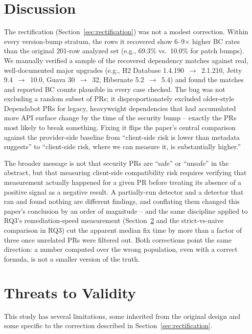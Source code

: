 \documentclass[10pt,journal]{IEEEtran}
\begin{document}
\section{Discussion}
The rectification (Section~\ref{sec:rectification}) was not a modest correction. Within every version-bump stratum, the rows it recovered show 6--9$\times$ higher BC rates than the original 201-row analyzed set (e.g., 69.3\% vs.\ 10.0\% for patch bumps). We manually verified a sample of the recovered dependency matches against real, well-documented major upgrades (e.g., H2 Database 1.4.190~$\to$~2.1.210, Jetty 9.4~$\to$~10.0, Guava 30~$\to$~32, Hibernate 5.2~$\to$~5.4) and found the matches and reported BC counts plausible in every case checked. The bug was not excluding a random subset of PRs; it disproportionately excluded older-style Dependabot PRs for legacy, heavyweight dependencies that had accumulated more API surface change by the time of the security bump -- exactly the PRs most likely to break something. Fixing it flips the paper's central comparison against the provider-side baseline from ``client-side risk is lower than metadata suggests'' to ``client-side risk, where we can measure it, is substantially higher.''

The broader message is not that security PRs are ``safe'' or ``unsafe'' in the abstract, but that measuring client-side compatibility risk requires verifying that measurement actually happened for a given PR before treating its absence of a positive signal as a negative result. A partially-run detector and a detector that ran and found nothing are different findings, and conflating them changed this paper's conclusion by an order of magnitude -- and the same discipline applied to RQ3's remediation-speed measurement (Section~\ref{sec:threats} and the strict-vs-naive comparison in RQ3) cut the apparent median fix time by more than a factor of three once unrelated PRs were filtered out. Both corrections point the same direction: a number computed over the wrong population, even with a correct formula, is not a smaller version of the truth.

\section{Threats to Validity}
\label{sec:threats}
This study has several limitations, some inherited from the original design and some specific to the correction described in Section~\ref{sec:rectification}.
\end{document}
